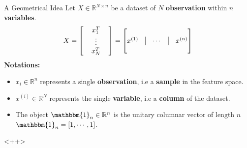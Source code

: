 \documentclass[10pt]{beamer}
\theoremstyle{definition}
\newcommand{\R}{\mathbb{R}}
\newcommand{\1}{\mathbbm{1}}
\begin{document}
\begin{frame}{A Geometrical Idea}
  Let $X \in \R^{N\times n}$ be a dataset of $N$
  {\bf observation} within $n$ {\bf variables}. 
  \begin{equation}
    X =
    \begin{bmatrix}
      \, & x_1 ^ T &\,\\
      \, & \vdots &\,\\
      \, & x_N ^ T &\,\\
    \end{bmatrix}
    =
    \begin{bmatrix}
      & & & \\
      x^{(1)} &\vline& \cdots& \vline& x^{(n)}\\
      & & & \\
    \end{bmatrix}
    \label{Geometrical view}
  \end{equation}
  {\bf Notations:}
  \begin{itemize}
    \item $x_i\in\R^n$ represents a single {\bf observation}, i.e a {\bf
      sample} in the feature space.
    \item $x^{(i)}\in\R^N$ represents the single {\bf variable}, i.e a {\bf
      column} of the dataset.
    \item The object $\1_n\in\R^n$ is the unitary columnar vector of length
      $n$ $\1_n=[1,\cdots,1]$.
  \end{itemize}
\end{frame}
\begin{frame}
  
\end{frame}<++>
\end{document}
